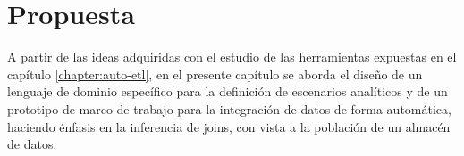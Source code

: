 \chapter{Propuesta}\label{chapter:proposal}

A partir de las ideas adquiridas con el estudio de las herramientas expuestas en el cap\'itulo \ref{chapter:auto-etl}, 
en el presente cap\'itulo se aborda el diseño de un lenguaje de dominio espec\'ifico para la definición de 
escenarios analíticos y de un prototipo de marco de trabajo para la integración de datos de forma automática, 
haciendo \'enfasis en la inferencia de joins, con vista a la población de un almacén de datos.

